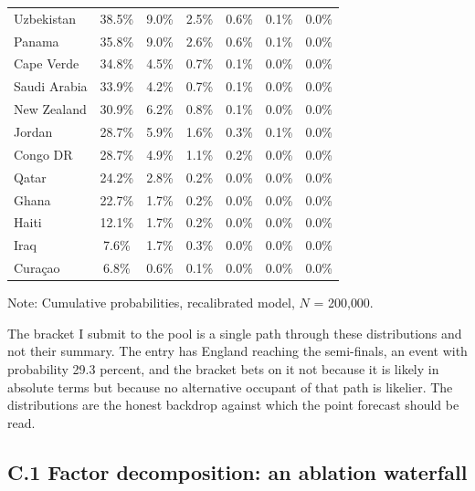 \documentclass[11pt,letterpaper]{article}
\begin{document}
\begin{table}[p]
\begin{small}
\begin{threeparttable}
{\begin{tabular*}{\textwidth}{@{\extracolsep{\fill}} lcccccc}
Uzbekistan             & 38.5\% &  9.0\% &  2.5\% &  0.6\% &  0.1\% &  0.0\% \\
Panama                 & 35.8\% &  9.0\% &  2.6\% &  0.6\% &  0.1\% &  0.0\% \\
Cape Verde             & 34.8\% &  4.5\% &  0.7\% &  0.1\% &  0.0\% &  0.0\% \\
Saudi Arabia           & 33.9\% &  4.2\% &  0.7\% &  0.1\% &  0.0\% &  0.0\% \\
New Zealand            & 30.9\% &  6.2\% &  0.8\% &  0.1\% &  0.0\% &  0.0\% \\
Jordan                 & 28.7\% &  5.9\% &  1.6\% &  0.3\% &  0.1\% &  0.0\% \\
Congo DR               & 28.7\% &  4.9\% &  1.1\% &  0.2\% &  0.0\% &  0.0\% \\
Qatar                  & 24.2\% &  2.8\% &  0.2\% &  0.0\% &  0.0\% &  0.0\% \\
Ghana                  & 22.7\% &  1.7\% &  0.2\% &  0.0\% &  0.0\% &  0.0\% \\
Haiti                  & 12.1\% &  1.7\% &  0.2\% &  0.0\% &  0.0\% &  0.0\% \\
Iraq                   &  7.6\% &  1.7\% &  0.3\% &  0.0\% &  0.0\% &  0.0\% \\
Curaçao                &  6.8\% &  0.6\% &  0.1\% &  0.0\% &  0.0\% &  0.0\% \\
      \bottomrule
    \end{tabular*}}
    \begin{tablenotes}\notesize
      \item Note: Cumulative probabilities, recalibrated model, $N$ = 200{,}000.
    \end{tablenotes}
  \end{threeparttable}
  \end{small}
\end{table}

The bracket I submit to the pool is a single path through these distributions and not their summary. The entry has England reaching the semi-finals, an event with probability 29.3 percent, and the bracket bets on it not because it is likely in absolute terms but because no alternative occupant of that path is likelier. The distributions are the honest backdrop against which the point forecast should be read.

\subsection*{C.1 \quad Factor decomposition: an ablation waterfall}
\end{document}
